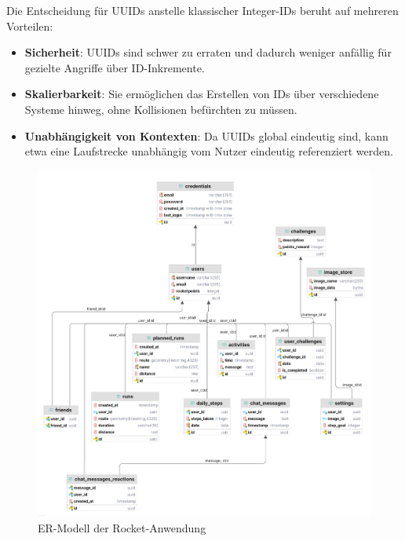 \documentclass[11pt,a4paper]{article}
\begin{document}
Die Entscheidung für UUIDs anstelle klassischer Integer-IDs beruht auf mehreren Vorteilen:
\begin{itemize}
    \item \textbf{Sicherheit}: UUIDs sind schwer zu erraten und dadurch weniger anfällig für gezielte Angriffe über ID-Inkremente.
    \item \textbf{Skalierbarkeit}: Sie ermöglichen das Erstellen von IDs über verschiedene Systeme hinweg, ohne Kollisionen befürchten zu müssen.
    \item \textbf{Unabhängigkeit von Kontexten}: Da UUIDs global eindeutig sind, kann etwa eine Laufstrecke unabhängig vom Nutzer eindeutig referenziert werden.
\end{itemize}

\begin{figure}[H]
    \centering
    \includegraphics[width=0.8\linewidth]{images/RocketERLight.png}
    \caption{ER-Modell der Rocket-Anwendung}
\end{figure}
\end{document}
